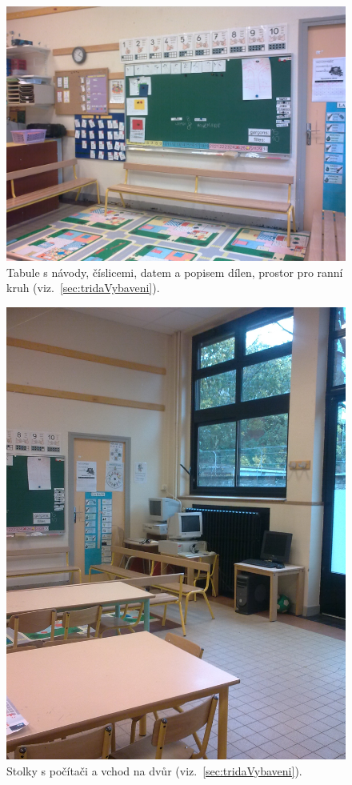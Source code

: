 	\begin{figure}[tb]
		\centering
		\includegraphics[height = 0.35\textheight]{./fotky/Obr1.jpg}
		\caption{
			Tabule s návody, číslicemi, datem a popisem dílen, prostor pro ranní kruh (viz.~\ref{sec:tridaVybaveni}).
		}
		\label{Obr1}
	\end{figure}

	\begin{figure}[tb]
		\centering
		\includegraphics[height = 0.35\textheight]{./fotky/Obr2.jpg}
		\caption{
			Stolky s počítači a vchod na dvůr (viz.~\ref{sec:tridaVybaveni}).
		}
		\label{Obr2}
	\end{figure}

